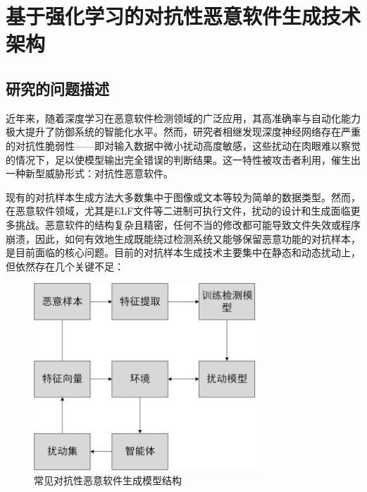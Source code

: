 \chapter{基于强化学习的对抗性恶意软件生成技术架构}
\section{研究的问题描述}
近年来，随着深度学习在恶意软件检测领域的广泛应用，其高准确率与自动化能力极大提升了防御系统的智能化水平。然而，研究者相继发现深度神经网络存在严重的对抗性脆弱性——即对输入数据中微小扰动高度敏感，这些扰动在肉眼难以察觉的情况下，足以使模型输出完全错误的判断结果。这一特性被攻击者利用，催生出一种新型威胁形式：对抗性恶意软件。

现有的对抗样本生成方法大多数集中于图像或文本等较为简单的数据类型。然而，在恶意软件领域，尤其是ELF文件等二进制可执行文件，扰动的设计和生成面临更多挑战。恶意软件的结构复杂且精密，任何不当的修改都可能导致文件失效或程序崩溃，因此，如何有效地生成既能绕过检测系统又能够保留恶意功能的对抗样本，是目前面临的核心问题。目前的对抗样本生成技术主要集中在静态和动态扰动上，但依然存在几个关键不足：

\begin{figure}[hbt]
	\centering
	\includegraphics[width=0.75\textwidth]{figures/3.1}
	\caption{常见对抗性恶意软件生成模型结构}\label{fig:3.1}
\end{figure}

